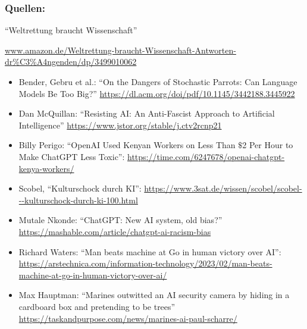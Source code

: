 \documentclass[aspectratio=169,usenames,dvipsnames]{beamer}
\begin{document}
\begin{frame}[fragile]
\frametitle{Quellen:}
\scriptsize
\begin{center}
``Weltrettung braucht Wissenschaft''

\url{www.amazon.de/Weltrettung-braucht-Wissenschaft-Antworten-dr%C3%A4ngenden/dp/3499010062}
\end{center}
\medskip

\begin{itemize}
\item Bender, Gebru et al.: ``On the Dangers of Stochastic Parrots: Can Language Models Be Too Big?'' \url{https://dl.acm.org/doi/pdf/10.1145/3442188.3445922}
\item Dan McQuillan: ``Resisting AI: An Anti-Fascist Approach to Artificial Intelligence'' \url{https://www.jstor.org/stable/j.ctv2rcnp21}
\item Billy Perigo: ``OpenAI Used Kenyan Workers on Less Than $\$$2 Per Hour to Make ChatGPT Less Toxic'': \url{https://time.com/6247678/openai-chatgpt-kenya-workers/}
\item Scobel, ``Kulturschock durch KI'': \url{https://www.3sat.de/wissen/scobel/scobel---kulturschock-durch-ki-100.html}
\item Mutale Nkonde: ``ChatGPT: New AI system, old bias?'' \url{https://mashable.com/article/chatgpt-ai-racism-bias}
\item Richard Waters: ``Man beats machine at Go in human victory over AI'': \url{https://arstechnica.com/information-technology/2023/02/man-beats-machine-at-go-in-human-victory-over-ai/}
\item Max Hauptman: ``Marines outwitted an AI security camera by hiding in a cardboard box and pretending to be trees'' \url{https://taskandpurpose.com/news/marines-ai-paul-scharre/}
\end{itemize}
\end{frame}
\end{document}
